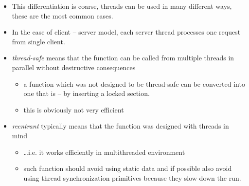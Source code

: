 \begin{itemize}
\item This differentiation is coarse, threads can be used in many different
ways, these are the most common cases.
\item In the case of client -- server model, each server thread processes
one request from single client.
\end{itemize}



\begin{slide}

\begin{itemize}
\item \emph{thread-safe} means that the function can be called from multiple
threads in parallel without destructive consequences
\begin{itemize}
\item a function which was not designed to be thread-safe can be
converted into one that is -- by inserting a locked section.
\item this is obviously not very efficient
\end{itemize}
\item \emph{reentrant} typically means that the function was designed
with threads in mind
\begin{itemize}
\item \dots{}i.e. it works efficiently in multithreaded environment
\item such function should avoid using static data and if possible also
avoid using thread synchronization primitives because they slow down 
the run.
\end{itemize}
\end{itemize}
\end{slide}

\label{THREADSAFE}

